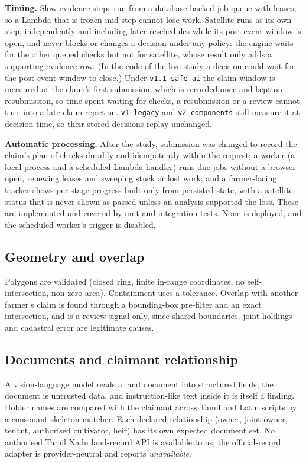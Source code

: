 \documentclass{ieeeaccess}
\begin{document}
\textbf{Timing.} Slow evidence steps run from a database-backed job queue with leases, so a Lambda that is frozen mid-step cannot lose work. Satellite runs as its own step, independently and including later reschedules while its post-event window is open, and never blocks or changes a decision under any policy: the engine waits for the other queued checks but not for satellite, whose result only adds a supporting evidence row. (In the code of the live study a decision could wait for the post-event window to close.) Under \texttt{v1.1-safe-ai} the claim window is measured at the claim's first submission, which is recorded once and kept on resubmission, so time spent waiting for checks, a resubmission or a review cannot turn into a late-claim rejection. \texttt{v1-legacy} and \texttt{v2-components} still measure it at decision time, so their stored decisions replay unchanged.

\textbf{Automatic processing.} After the study, submission was changed to record the claim's plan of checks durably and idempotently within the request; a worker (a local process and a scheduled Lambda handler) runs due jobs without a browser open, renewing leases and sweeping stuck or lost work; and a farmer-facing tracker shows per-stage progress built only from persisted state, with a satellite status that is never shown as passed unless an analysis supported the loss. These are implemented and covered by unit and integration tests. None is deployed, and the scheduled worker's trigger is disabled.

\subsection{Geometry and overlap}
Polygons are validated (closed ring, finite in-range coordinates, no self-intersection, non-zero area). Containment uses a tolerance. Overlap with another farmer's claim is found through a bounding-box pre-filter and an exact intersection, and is a review signal only, since shared boundaries, joint holdings and cadastral error are legitimate causes.

\subsection{Documents and claimant relationship}
A vision-language model reads a land document into structured fields; the document is untrusted data, and instruction-like text inside it is itself a finding. Holder names are compared with the claimant across Tamil and Latin scripts by a consonant-skeleton matcher. Each declared relationship (owner, joint owner, tenant, authorised cultivator, heir) has its own expected document set. No authorised Tamil Nadu land-record API is available to us; the official-record adapter is provider-neutral and reports \emph{unavailable}.
\end{document}
